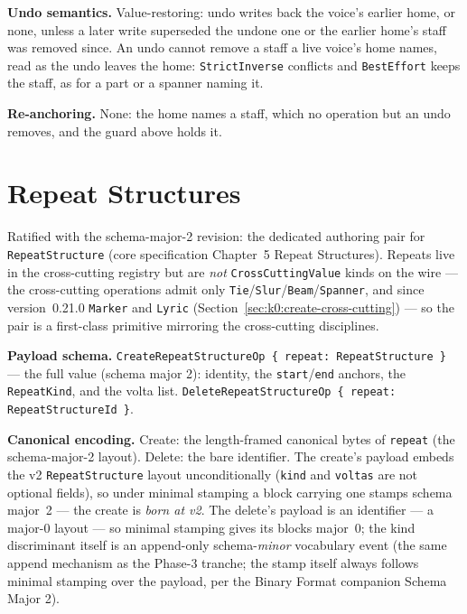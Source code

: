 \documentclass[11pt,letterpaper]{report}
\newcommand{\sectionsc}[1]{{\addfontfeatures{Letters=SmallCaps}#1}}
\begin{document}
\textbf{Undo semantics.} Value-restoring: undo writes back the voice's earlier
home, or none, unless a later write superseded the undone one or the earlier
home's staff was removed since. An undo cannot remove a staff a live voice's
home names, read as the undo leaves the home: \texttt{StrictInverse}
conflicts and \texttt{BestEffort} keeps the staff, as for a part or a
spanner naming it.

\textbf{Re-anchoring.} None: the home names a staff, which no operation but an
undo removes, and the guard above holds it.

\section{Repeat Structures}
\label{sec:k0:repeat-structures}

Ratified with the schema-major-2 revision: the dedicated authoring pair for
\texttt{RepeatStructure} (core specification Chapter~5
\sectionsc{Repeat Structures}). Repeats live in the cross-cutting registry
but are \emph{not} \texttt{CrossCuttingValue} kinds on the wire --- the
cross-cutting operations admit only
\texttt{Tie}/\texttt{Slur}/\texttt{Beam}/\texttt{Spanner}, and since
version~0.21.0 \texttt{Marker} and \texttt{Lyric}
(Section~\ref{sec:k0:create-cross-cutting}) --- so the pair is a
first-class primitive mirroring the cross-cutting disciplines.

\textbf{Payload schema.} \texttt{CreateRepeatStructureOp \{ repeat:
RepeatStructure \}} --- the full value (schema major 2): identity, the
\texttt{start}/\texttt{end} anchors, the \texttt{RepeatKind}, and the
volta list. \texttt{DeleteRepeatStructureOp \{ repeat: RepeatStructureId
\}}.

\textbf{Canonical encoding.} Create: the length-framed canonical bytes of
\texttt{repeat} (the schema-major-2 layout). Delete: the bare identifier.
The create's payload embeds the v2 \texttt{RepeatStructure} layout
unconditionally (\texttt{kind} and \texttt{voltas} are not optional
fields), so under minimal stamping a block carrying one stamps schema
major~2 --- the create is \emph{born at v2}. The delete's payload is an
identifier --- a major-0 layout --- so minimal stamping gives its blocks
major~0; the kind discriminant itself is an append-only schema-\emph{minor}
vocabulary event (the same append mechanism as the Phase-3 tranche; the
stamp itself always follows minimal stamping over the payload, per the
Binary Format companion \sectionsc{Schema Major 2}).
\end{document}
